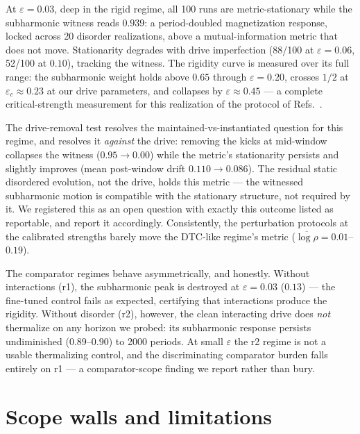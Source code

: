 \documentclass[a4paper,11pt,noarxiv]{quantumarticle}
\newcommand{\logr}{\log\rho}
\begin{document}
At $\varepsilon = 0.03$, deep in the rigid regime, all 100 runs are
metric-stationary while the subharmonic witness reads $0.939$: a
period-doubled magnetization response, locked across 20 disorder
realizations, above a mutual-information metric that does not move.
Stationarity degrades with drive imperfection (88/100 at $\varepsilon =
0.06$, 52/100 at $0.10$), tracking the witness. The rigidity curve is
measured over its full range: the subharmonic weight holds above
$0.65$ through $\varepsilon = 0.20$, crosses $1/2$ at $\varepsilon_c
\approx 0.23$ at our drive parameters, and collapses by $\varepsilon
\approx 0.45$ --- a complete critical-strength measurement for this
realization of the protocol of Refs.~\cite{SRC043,SRC044}.

The drive-removal test resolves the maintained-vs-instantiated
question for this regime, and resolves it \emph{against} the drive:
removing the kicks at mid-window collapses the witness
($0.95 \to 0.00$) while the metric's stationarity persists and
slightly improves (mean post-window drift $0.110 \to 0.086$). The residual static disordered evolution, not the drive, holds this
metric --- the witnessed subharmonic motion is compatible with the
stationary structure, not required by it. We registered this as an open
question with exactly this outcome listed as reportable, and report it
accordingly. Consistently, the perturbation protocols at the calibrated
strengths barely move the DTC-like regime's metric ($\overline{\logr} =
0.01$--$0.19$).

The comparator regimes behave asymmetrically, and honestly. Without
interactions (r1), the subharmonic peak is destroyed at $\varepsilon =
0.03$ ($0.13$) --- the fine-tuned control fails as expected, certifying
that interactions produce the rigidity. Without disorder (r2), however,
the clean interacting drive does \emph{not} thermalize on any horizon
we probed: its subharmonic response persists undiminished
($0.89$--$0.90$) to 2000 periods. At small $\varepsilon$ the r2 regime
is not a usable thermalizing control, and the discriminating comparator
burden falls entirely on r1 --- a comparator-scope finding we report
rather than bury.

\section{Scope walls and limitations}\label{sec:scope}
\end{document}
